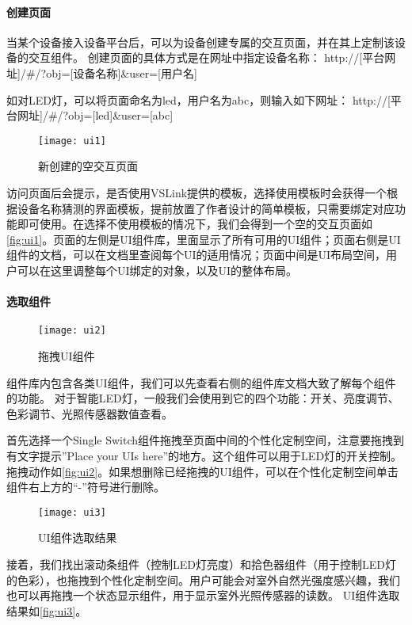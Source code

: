 \paragraph{创建页面}
当某个设备接入设备平台后，可以为设备创建专属的交互页面，并在其上定制该设备的交互组件。
创建页面的具体方式是在网址中指定设备名称：
http://[平台网址]/\#/?obj=[设备名称]\&user=[用户名]

如对LED灯，可以将页面命名为led，用户名为abc，则输入如下网址：
http://[平台网址]/\#/?obj=[led]\&user=[abc]

\begin{figure}[htbp]
	\centering
	\texttt{[image: ui1]}
	\caption{新创建的空交互页面}
	\label{fig:ui1}
\end{figure}

访问页面后会提示，是否使用VSLink提供的模板，选择使用模板时会获得一个根据设备名称猜测的界面模板，提前放置了作者设计的简单模板，只需要绑定对应功能即可使用。在选择不使用模板的情况下，我们会得到一个空的交互页面如\autoref{fig:ui1}。页面的左侧是UI组件库，里面显示了所有可用的UI组件；页面右侧是UI组件的文档，可以在文档里查阅每个UI的适用情况；页面中间是UI布局空间，用户可以在这里调整每个UI绑定的对象，以及UI的整体布局。

\paragraph{选取组件}

\begin{figure}[htbp]
	\centering
	\texttt{[image: ui2]}
	\caption{拖拽UI组件}
	\label{fig:ui2}
\end{figure}

组件库内包含各类UI组件，我们可以先查看右侧的组件库文档大致了解每个组件的功能。
对于智能LED灯，一般我们会使用到它的四个功能：开关、亮度调节、色彩调节、光照传感器数值查看。

首先选择一个Single Switch组件拖拽至页面中间的个性化定制空间，注意要拖拽到有文字提示”Place your UIs here”的地方。这个组件可以用于LED灯的开关控制。拖拽动作如\autoref{fig:ui2}。如果想删除已经拖拽的UI组件，可以在个性化定制空间单击组件右上方的“-”符号进行删除。

\begin{figure}[t]
	\centering
	\texttt{[image: ui3]}
	\caption{UI组件选取结果}
	\label{fig:ui3}
\end{figure}

接着，我们找出滚动条组件（控制LED灯亮度）和拾色器组件（用于控制LED灯的色彩），也拖拽到个性化定制空间。用户可能会对室外自然光强度感兴趣，我们也可以再拖拽一个状态显示组件，用于显示室外光照传感器的读数。
UI组件选取结果如\autoref{fig:ui3}。


